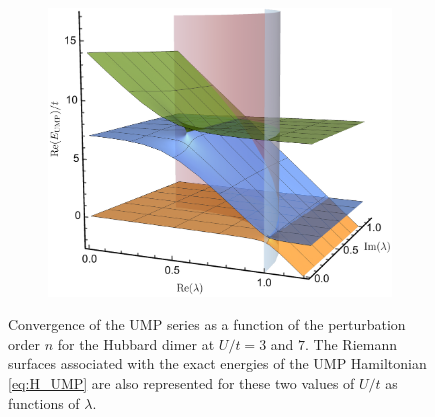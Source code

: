 \documentclass[aps,prb,reprint,noshowkeys,linenumbers,superscriptaddress]{revtex4-1}
\begin{document}
\begin{figure}
\begin{subfigure}{0.32\textwidth}
	\includegraphics[height=0.75\textwidth]{fig3c}	
    \end{subfigure}	\caption{
	Convergence of the UMP series as a function of the perturbation order $n$ for the Hubbard dimer at $U/t = 3$ and $7$.
	The Riemann surfaces associated with the exact energies of the UMP Hamiltonian \eqref{eq:H_UMP} are also represented for these two values of $U/t$ as functions of $\lambda$.
	\label{fig:UMP}}
\end{figure}
\end{document}
